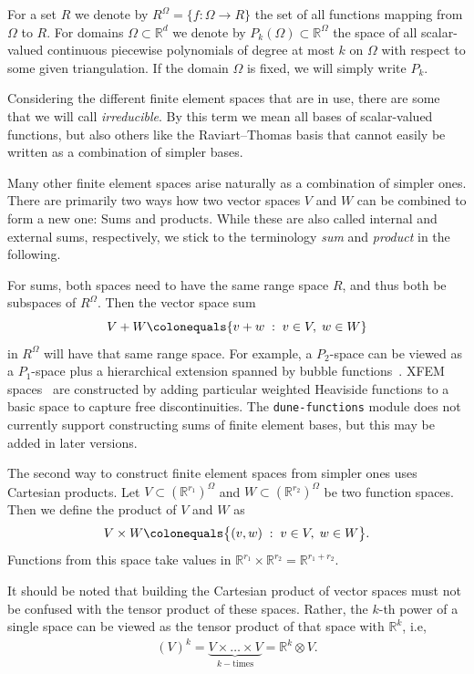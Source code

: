 \documentclass[a4paper,10pt,headings=normal,bibliography=totoc]{scrartcl}
\newcommand{\R}{\mathbb{R}}
\newcommand{\st}{\; : \;}
\newcommand{\dunemodule}[1]{\texttt{#1}}
\begin{document}
For a set $R$ we denote by $R^\Omega = \{f:\Omega \to R\}$
the set of all functions mapping from $\Omega$ to $R$. For domains $\Omega\subset \R^d$
we denote by $P_k(\Omega) \subset \R^\Omega$ the space of all
scalar-valued continuous piecewise polynomials of degree at most $k$ on $\Omega$
with respect to some given triangulation.
If the domain $\Omega$ is fixed, we will simply write $P_k$.

Considering the different finite element spaces that are in use, there are some that we will
call \emph{irreducible}.  By this term we mean all bases of scalar-valued functions,
but also others like the Raviart--Thomas basis that cannot easily be written as a combination
of simpler bases.

Many other finite element spaces arise naturally as a combination of simpler ones.
There are primarily two ways how two vector spaces $V$ and $W$ can be combined
to form a new one: Sums and products. While these are also called
internal and external sums, respectively, we stick to the terminology
\emph{sum} and \emph{product} in the following.

For sums, both spaces need to
have the same range space $R$, and thus both be subspaces of $R^\Omega$.
Then the vector space sum
\begin{equation*}
  V + W
  \colonequals
  \{ v + w \; : \; v \in V, \; w \in W \}
\end{equation*}
in $R^\Omega$ will have that same range space.
For example, a $P_2$-space
can be viewed as a $P_1$-space plus a hierarchical extension spanned by bubble functions~\cite{bank:1996}.
XFEM spaces~\cite{moes_dolbow_belytschko:1999} are constructed by adding particular weighted Heaviside
functions to a basic space to capture free discontinuities.
The \dunemodule{dune-functions} module does not currently support constructing sums
of finite element bases, but this may be added in later versions.

The second way to construct finite element spaces from simpler ones uses Cartesian products.
Let $V \subset (\R^{r_1})^\Omega$ and $W \subset (\R^{r_2})^\Omega$ be two function spaces.
Then we define the product of $V$ and $W$ as
\begin{align*}
  V \times W
    \colonequals \big\{ (v,w) \st v \in V, \; w \in W \big\}.
\end{align*}
Functions from this space take values in $\R^{r_1} \times \R^{r_2} = \R^{r_1 + r_2}$.

It should be noted that building the Cartesian product of
vector spaces must not be confused with the tensor product of these spaces.
Rather, the $k$-th power
of a single space can be viewed as the tensor product of that space with $\R^k$, i.e,
\begin{align*}
    (V)^k
    = \underbrace{V \times \dots \times V}_{k-\text{times}}
    = \R^k \otimes V.
\end{align*}
\end{document}
